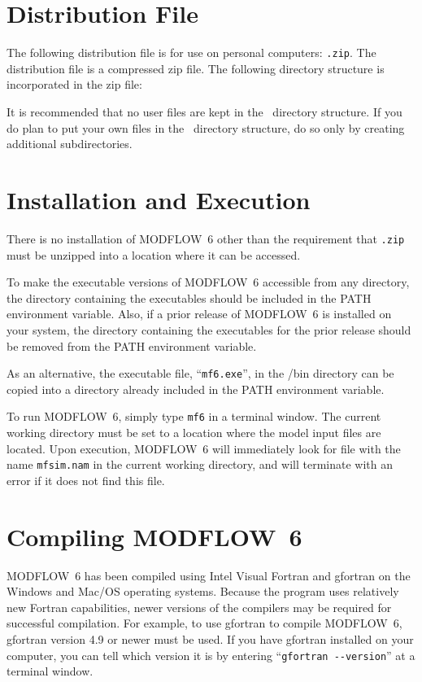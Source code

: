 \documentclass[11pt,twoside,twocolumn]{usgsreport}
\begin{document}
\section{Distribution File}
The following distribution file is for use on personal computers: \texttt{\modflowversion.zip}.  The distribution file is a compressed zip file. The following directory structure is incorporated in the zip file:



It is recommended that no user files are kept in the \modflowversion~directory structure.  If you do plan to put your own files in the \modflowversion~directory structure, do so only by creating additional subdirectories.

\section{Installation and Execution}
There is no installation of MODFLOW~6 other than the requirement that \texttt{\modflowversion.zip} must be unzipped into a location where it can be accessed.  

To make the executable versions of MODFLOW~6 accessible from any directory, the directory containing the executables should be included in the PATH environment variable.  Also, if a prior release of MODFLOW~6 is installed on your system, the directory containing the executables for the prior release should be removed from the PATH environment variable.

As an alternative, the executable file, ``\texttt{mf6.exe}'', in the \modflowversion{}/bin directory can be copied into a directory already included in the PATH environment variable.

To run MODFLOW~6, simply type \texttt{mf6} in a terminal window.  The current working directory must be set to a location where the model input files are located.  Upon execution, MODFLOW~6 will immediately look for file with the name \texttt{mfsim.nam} in the current working directory, and will terminate with an error if it does not find this file.

\section{Compiling MODFLOW~6}
MODFLOW~6 has been compiled using Intel Visual Fortran and gfortran on the Windows and Mac/OS operating systems.  Because the program uses relatively new Fortran capabilities, newer versions of the compilers may be required for successful compilation.  For example, to use gfortran to compile MODFLOW~6, gfortran version 4.9 or newer must be used.  If you have gfortran installed on your computer, you can tell which version it is by entering ``\verb|gfortran --version|'' at a terminal window.
\end{document}
